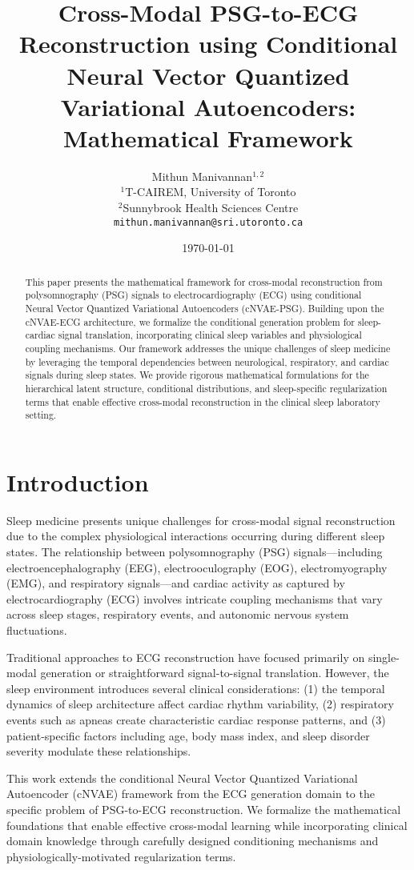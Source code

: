 \documentclass[11pt]{article}
\title{Cross-Modal PSG-to-ECG Reconstruction using Conditional Neural Vector Quantized Variational Autoencoders: Mathematical Framework}
\author{
    Mithun Manivannan$^{1,2}$ \\
    $^1$T-CAIREM, University of Toronto \\
    $^2$Sunnybrook Health Sciences Centre \\
    \texttt{mithun.manivannan@sri.utoronto.ca}
}
\date{\today}
\begin{document}
\maketitle

\begin{abstract}
This paper presents the mathematical framework for cross-modal reconstruction from polysomnography (PSG) signals to electrocardiography (ECG) using conditional Neural Vector Quantized Variational Autoencoders (cNVAE-PSG). Building upon the cNVAE-ECG architecture, we formalize the conditional generation problem for sleep-cardiac signal translation, incorporating clinical sleep variables and physiological coupling mechanisms. Our framework addresses the unique challenges of sleep medicine by leveraging the temporal dependencies between neurological, respiratory, and cardiac signals during sleep states. We provide rigorous mathematical formulations for the hierarchical latent structure, conditional distributions, and sleep-specific regularization terms that enable effective cross-modal reconstruction in the clinical sleep laboratory setting.
\end{abstract}

\section{Introduction}

Sleep medicine presents unique challenges for cross-modal signal reconstruction due to the complex physiological interactions occurring during different sleep states. The relationship between polysomnography (PSG) signals—including electroencephalography (EEG), electrooculography (EOG), electromyography (EMG), and respiratory signals—and cardiac activity as captured by electrocardiography (ECG) involves intricate coupling mechanisms that vary across sleep stages, respiratory events, and autonomic nervous system fluctuations.

Traditional approaches to ECG reconstruction have focused primarily on single-modal generation or straightforward signal-to-signal translation. However, the sleep environment introduces several clinical considerations: (1) the temporal dynamics of sleep architecture affect cardiac rhythm variability, (2) respiratory events such as apneas create characteristic cardiac response patterns, and (3) patient-specific factors including age, body mass index, and sleep disorder severity modulate these relationships.

This work extends the conditional Neural Vector Quantized Variational Autoencoder (cNVAE) framework from the ECG generation domain to the specific problem of PSG-to-ECG reconstruction. We formalize the mathematical foundations that enable effective cross-modal learning while incorporating clinical domain knowledge through carefully designed conditioning mechanisms and physiologically-motivated regularization terms.
\end{document}
